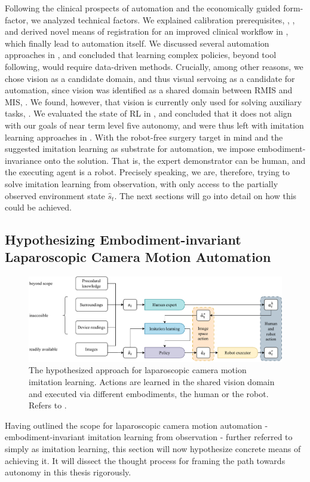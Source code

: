 Following the clinical prospects of automation and the economically guided form-factor, we analyzed technical factors. We explained calibration prerequisites, , , and derived novel means of registration for an improved clinical workflow in , which finally lead to automation itself. We discussed several automation approaches in , and concluded that learning complex policies, beyond tool following, would require data-driven methods. Crucially, among other reasons, we chose vision as a candidate domain, and thus visual servoing as a candidate for automation, since vision was identified as a shared domain between RMIS and MIS, . We found, however, that vision is currently only used for solving auxiliary tasks, . We evaluated the state of RL in , and concluded that it does not align with our goals of near term level five autonomy, and were thus left with imitation learning approaches in . With the robot-free surgery target in mind and the suggested imitation learning as substrate for automation, we impose embodiment-invariance onto the solution. That is, the expert demonstrator can be human, and the executing agent is a robot. Precisely speaking, we are, therefore, trying to solve imitation learning from observation, with only access to the partially observed environment state $\hat{s}_t$. The next sections will go into detail on how this could be achieved.

\subsection{Hypothesizing Embodiment-invariant Laparoscopic Camera Motion Automation}
\label{in:sec:hypothesizing}
\begin{figure}[tb]
    \centering
    \includegraphics[width=\textwidth]{introduction/fig/camera_motion_action.pdf}
    \caption{The hypothesized approach for laparoscopic camera motion imitation learning. Actions are learned in the shared vision domain and executed via different embodiments, the human or the robot. Refers to .}
    \label{in:fig:hypothesized_pipeline}
\end{figure}
Having outlined the scope for laparoscopic camera motion automation - embodiment-invariant imitation learning from observation - further referred to simply as imitation learning, this section will now hypothesize concrete means of achieving it. It will dissect the thought process for framing the path towards autonomy in this thesis rigorously.

